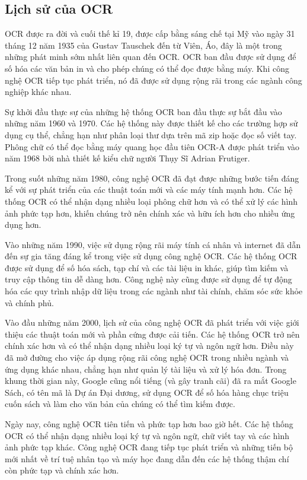 \subsection{Lịch sử của OCR}

OCR được ra đời và cuối thế kỉ 19, được cấp bằng sáng chế tại Mỹ vào ngày 31 tháng 12 năm 1935 của Gustav Tauschek đến từ Viên, Áo, đây là một trong những phát minh sớm nhất liên quan đến OCR. OCR ban đầu được sử dụng để số hóa các văn bản in và cho phép chúng có thể đọc được bằng máy. Khi công nghệ OCR tiếp tục phát triển, nó đã được sử dụng rộng rãi trong các ngành công nghiệp khác nhau.

Sự khởi đầu thực sự của những hệ thống OCR ban đầu thực sự bắt đầu vào những năm 1960 và 1970. Các hệ thống này được thiết kế cho các trường hợp sử dụng cụ thể, chẳng hạn như phân loại thư dựa trên mã zip hoặc đọc số viết tay. Phông chữ có thể đọc bằng máy quang học đầu tiên OCR-A được phát triển vào năm 1968 bởi nhà thiết kế kiểu chữ người Thụy Sĩ Adrian Frutiger.

Trong suốt những năm 1980, công nghệ OCR đã đạt được những bước tiến đáng kể với sự phát triển của các thuật toán mới và các máy tính mạnh hơn. Các hệ thống OCR có thể nhận dạng nhiều loại phông chữ hơn và có thể xử lý các hình ảnh phức tạp hơn, khiến chúng trở nên chính xác và hữu ích hơn cho nhiều ứng dụng hơn.

Vào những năm 1990, việc sử dụng rộng rãi máy tính cá nhân và internet đã dẫn đến sự gia tăng đáng kể trong việc sử dụng công nghệ OCR. Các hệ thống OCR được sử dụng để số hóa sách, tạp chí và các tài liệu in khác, giúp tìm kiếm và truy cập thông tin dễ dàng hơn. Công nghệ này cũng được sử dụng để tự động hóa các quy trình nhập dữ liệu trong các ngành như tài chính, chăm sóc sức khỏe và chính phủ.

Vào đầu những năm 2000, lịch sử của công nghệ OCR đã phát triển với việc giới thiệu các thuật toán mới và phần cứng được cải tiến. Các hệ thống OCR trở nên chính xác hơn và có thể nhận dạng nhiều loại ký tự và ngôn ngữ hơn. Điều này đã mở đường cho việc áp dụng rộng rãi công nghệ OCR trong nhiều ngành và ứng dụng khác nhau, chẳng hạn như quản lý tài liệu và xử lý hóa đơn. Trong khung thời gian này, Google cũng nổi tiếng (và gây tranh cãi) đã ra mắt Google Sách, có tên mã là Dự án Đại dương, sử dụng OCR để số hóa hàng chục triệu cuốn sách và làm cho văn bản của chúng có thể tìm kiếm được.

Ngày nay, công nghệ OCR tiên tiến và phức tạp hơn bao giờ hết. Các hệ thống OCR có thể nhận dạng nhiều loại ký tự và ngôn ngữ, chữ viết tay và các hình ảnh phức tạp khác. Công nghệ OCR đang tiếp tục phát triển và những tiến bộ mới nhất về trí tuệ nhân tạo và máy học đang dẫn đến các hệ thống thậm chí còn phức tạp và chính xác hơn.

